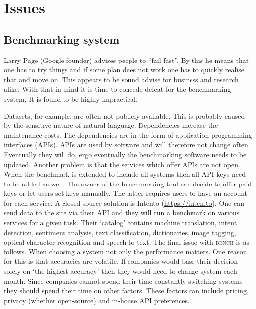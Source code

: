 \section{Issues}
\label{sec:issues}


\subsection{Benchmarking system}
\label{subsec:benchmarking_system}
Larry Page (Google founder) advises people to ``fail fast''.
By this he means that one has to try things and if some plan does not work one has to quickly realise that and move on.
This appears to be sound advise for business and research alike.
With that in mind it is time to concede defeat for the benchmarking system.
It is found to be highly impractical.

Datasets, for example, are often not publicly available.
This is probably caused by the sensitive nature of natural language.
Dependencies increase the maintenance costs.
The dependencies are in the form of application programming interfaces (APIs).
APIs are used by software and will therefore not change often.
Eventually they will do, ergo eventually the benchmarking software needs to be updated.
Another problem is that the services which offer APIs are not open.
When the benchmark is extended to include all systems then all API keys need to be added as well.
The owner of the benchmarking tool can decide to offer paid keys or let users set keys manually.
The latter requires users to have an account for each service.
A closed-source solution is Intento (\url{https://inten.to}).
One can send data to the site via their API and they will run a benchmark on various services for a given task.
Their `catalog' contains machine translation, intent detection, sentiment analysis, text classification, dictionaries, image tagging, optical character recognition and speech-to-text.
The final issue with \textsc{bench} is as follows.
When choosing a system not only the performance matters.
One reason for this is that accuracies are volatile.
If companies would base their decision solely on `the highest accuracy' then they would need to change system each month.
Since companies cannot spend their time constantly switching systems they should spend their time on other factors.
These factors can include pricing, privacy (whether open-source) and in-house API preferences.

